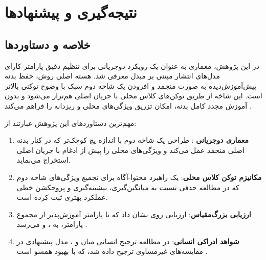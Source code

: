 \chapter{نتیجه‌گیری و پیشنهادها}
\label{ch:conclusion}

\section{خلاصه و دستاوردها}
در این پژوهش، معماری  به عنوان یک رویکرد دوجریانی برای تنظیم دقیق پارامتر-کارای مدل‌های انتشار مبتنی بر مبدل معرفی شد. هسته اصلی روش، حفظ بدنه پیش‌آموزش‌دیده  به صورت منجمد و افزودن یک شاخه دوم سبک با وضوح توکنی بالاتر است. این شاخه از طریق توکن‌های کلاس محلی با جریان اصلی هم‌تراز می‌شود و بدون آموزش مجدد کامل بدنه، امکان تزریق ویژگی‌های محلی و ریزدانه را فراهم می‌کند \cite{2212.09748,8409325}.

مهم‌ترین دستاوردهای این پژوهش عبارتند از:
\begin{enumerate}
    \item \textbf{معماری دوجریانی }: طراحی یک شاخه دوم با اندازه پچ کوچک‌تر که در کنار بدنه اصلی منجمد عمل می‌کند و ویژگی‌های محلی را پیش از ادغام با جریان اصلی استخراج می‌نماید.
    \item \textbf{مکانیزم توکن کلاس محلی}: یک راهبرد محتوا-آگاه برای تجمیع ویژگی‌های شاخه دوم که در مطالعه حذفی نسبت به میانگین‌گیری، بیشینه‌گیری و پروجکشن خطی عملکرد بهتری ثبت کرده است.
    \item \textbf{ارزیابی بزرگ‌مقیاس}: ارزیابی روی  نشان داد که  با  پارامتر آموزش‌پذیر از مجموع  پارامتر، به ،  و  می‌رسد \cite{heusel2017fid,binkowski2018kid,zhang2018lpips}.
    \item \textbf{شواهد ادراکی انسانی}: در مطالعه ترجیح انسانی میان  و ، مدل پیشنهادی در  مقایسه‌های غیرمساوی ترجیح داده شد، که با بهبود  همسو است \cite{Yao2025LightningDiT}.
\end{enumerate}

